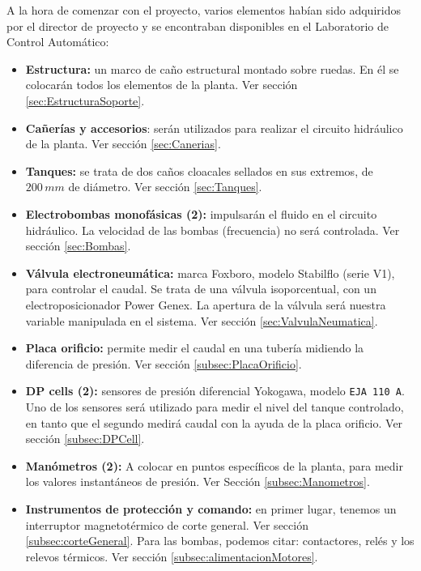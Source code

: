 A la hora de comenzar con el proyecto, varios elementos habían
sido adquiridos por el director de proyecto y se encontraban
disponibles en el Laboratorio de Control Automático:
\begin{itemize}
  \item \textbf{Estructura:} un marco de caño estructural montado sobre
  ruedas. En él se colocarán todos los elementos de la planta.
  Ver sección \ref{sec:EstructuraSoporte}.

  \item \textbf{Cañerías y accesorios}: serán utilizados para realizar el
  circuito hidráulico de la planta. Ver sección \ref{sec:Canerias}.

  \item \textbf{Tanques:} se trata de dos caños cloacales sellados en sus
  extremos, de $200\,mm$ de diámetro. Ver sección \ref{sec:Tanques}.

  \item \textbf{Electrobombas monofásicas (2):} impulsarán el fluido
  en el circuito hidráulico.
  La velocidad de las bombas (frecuencia) no será controlada.
  Ver sección \ref{sec:Bombas}.

  \item \textbf{Válvula electroneumática:} marca Foxboro, modelo
  Stabilflo (serie V1), para controlar el caudal.
  Se trata de una válvula isoporcentual, con un electroposicionador
  Power Genex.
  La apertura de la válvula será nuestra variable manipulada en
  el sistema.
  Ver sección \ref{sec:ValvulaNeumatica}.

  \item \textbf{Placa orificio:} permite medir el
  caudal en una tubería midiendo la diferencia de presión.
  Ver sección \ref{subsec:PlacaOrificio}.

  \item \textbf{DP cells (2):} sensores de presión
  diferencial Yokogawa, modelo \verb|EJA 110 A|.
  Uno de los sensores será utilizado para medir el nivel del tanque controlado,
  en tanto que el segundo medirá caudal con la ayuda de la placa orificio.
  Ver sección \ref{subsec:DPCell}.

  \item \textbf{Manómetros (2):} A colocar en
  puntos específicos de la planta, para medir los valores instantáneos de
  presión.
  Ver Sección \ref{subsec:Manometros}.

  \item \textbf{Instrumentos de protección y comando:}
  en primer lugar, tenemos un interruptor magnetotérmico de corte general.
  Ver sección \ref{subsec:corteGeneral}.
  Para las bombas, podemos citar: contactores, relés y los relevos térmicos.
  Ver sección \ref{subsec:alimentacionMotores}.


\end{itemize}
